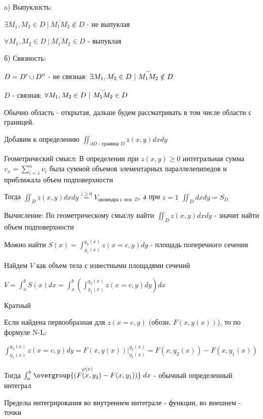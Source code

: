 \documentclass[12pt]{article}
\begin{document}
    a) Выпуклость:

    $\exists M_1, M_2 \in D \ | \ \overline{M_1 M_2} \notin D$ - не выпуклая

    $\forall M_1, M_2 \in D \ | \ \overline{M_1 M_2} \in D$ - выпуклая

    б) Связность:

    $D = D^\prime \cup D^{\prime\prime}$ - не связная: $\exists M_1, M_2 \in D \ | \ \overset{\LARGE\smile}{M_1 M_2} \notin D$

    $D$ - связная: $\forall M_1, M_2 \in D \ | \ \overset{\LARGE\smile}{M_1 M_2} \in D$

    Обычно область - открытая, дальше будем рассматривать в том числе области с границей.

    Добавим к определению $\iint_{\partial D \text{ - граница } D} z(x, y) dx dy$

    Геометрический смысл: В определении при $z(x, y) \geq 0$ интегральная сумма $v_n = \sum_{i=1}^n \nu_i$ была суммой объемов элементарных параллелепипедов и приближала объем подповерхности

    Тогда $\iint_D z(x, y) dx dy \stackrel{z \geq 0}{=} V_{\text{цилиндра с осн. } D}$, а при $z = 1$ $\iint_D dx dy = S_D$

    \hypertarget{doubleintegralcalculation}{}

    Вычисление: По геометрическому смыслу найти $\iint_D z(x, y) dx dy$ - значит найти объем подповерхности

    Можно найти $S(x) = \int^{y_2(x)}_{y_1(x)} z(x = c, y) dy$ - площадь поперечного сечения

    Найдем $V$ как объем тела с известными площадями сечений

    $V = \int^b_a S(x) dx = \int_a^b \left(\int^{y_2(x)}_{y_1(x)} z(x = c, y) dy\right) dx$

    \hypertarget{multipleintegral}{}

    \Nota Кратный

    Если найдена первообразная для $z(x = c, y)$ (обозн. $F(x, y(x))$), то по формуле N-L:

    $\int^{y_2(x)}_{y_1(x)} z(x = c, y) dy = F(x, y(x)) \Big|^{y_2(x)}_{y_1(x)} = F(x, y_2(x)) - F(x, y_1(x))$

    Тогда $\int^b_a \stackrel{\varphi(x)}{\overgroup{(F(x, y_2) - F(x, y_1))}} dx$ - обычный определенный интеграл

    Пределы интегрирования во внутреннем интеграле - функции, во внешнем - точки
\end{document}
